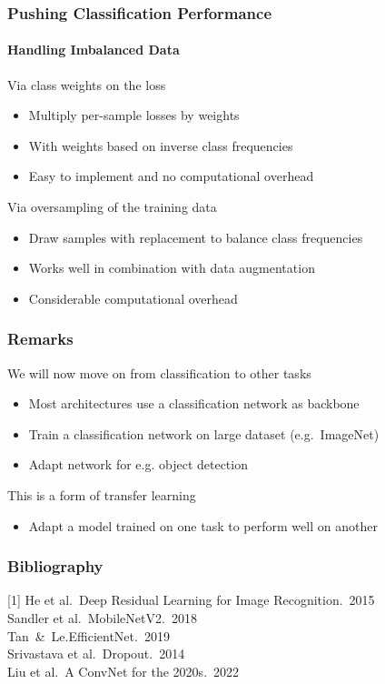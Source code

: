\documentclass[xetex,professionalfont]{beamer}
\let\oldemph\emph
\renewcommand\emph[1]{\textcolor{tuwcvl_cvl_blue}{#1}}
\begin{document}
\begin{frame}
	\frametitle{Pushing Classification Performance}
	\framesubtitle{Handling Imbalanced Data}

	Via \emph{class weights} on the loss
	\begin{itemize}
		\item Multiply per-sample losses by weights
		\item With weights based on inverse class frequencies
		\item Easy to implement and no computational overhead
	\end{itemize}

	\bigskip

	Via \emph{oversampling} of the training data
	\begin{itemize}
		\item Draw samples with replacement to balance class frequencies
		\item Works well in combination with data augmentation
		\item Considerable computational overhead
	\end{itemize}

\end{frame}


\begin{frame}
	\frametitle{Remarks}

	We will now move on from classification to other tasks
	\begin{itemize}
		\item Most architectures use a classification network as \emph{backbone} %
		\item Train a classification network on large dataset (e.g.~ImageNet)
		\item Adapt network for e.g. object detection
	\end{itemize}

	\bigskip

	This is a form of \emph{transfer learning}
	\begin{itemize}
		\item Adapt a model trained on one task to perform well on another %
	\end{itemize}

\end{frame}


\renewcommand\emph[1]{\oldemph{#1}}

\begin{frame}
	\frametitle{Bibliography}

	[1] He et al.~Deep Residual Learning for Image Recognition.~2015 \\\medskip
	[2] Sandler et al.~MobileNetV2.~2018 \\\medskip
	[3] Tan~\&~Le.EfficientNet.~2019 \\\medskip
	[4] Srivastava et al.~Dropout.~2014 \\\medskip
	[5] Liu et al.~A ConvNet for the 2020s.~2022

\end{frame}
\end{document}
